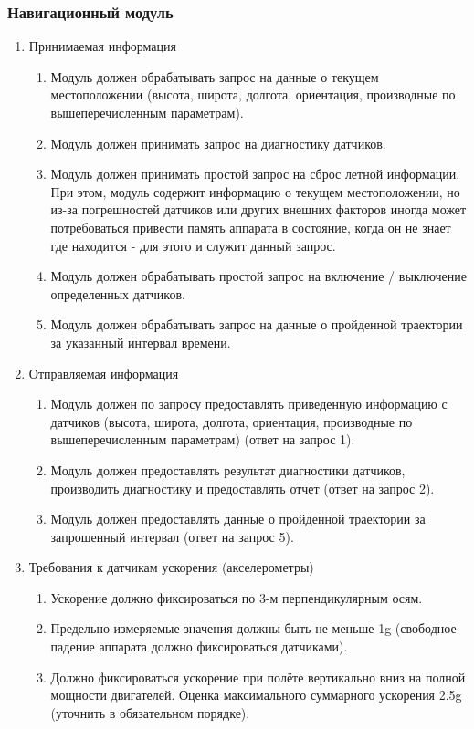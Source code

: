 \documentclass[utf8]{report}
\begin{document}
\subsubsection{Навигационный модуль}
\begin{enumerate}
  \item Принимаемая информация
  \begin{enumerate}
    \item Модуль должен обрабатывать запрос на данные о текущем местоположении (высота, широта, долгота, ориентация, производные по вышеперечисленным параметрам).
    \item Модуль должен принимать запрос на диагностику датчиков.
    \item Модуль должен принимать простой запрос на сброс летной информации. При этом, модуль содержит информацию о текущем местоположении, но из-за погрешностей датчиков или других внешних факторов иногда может потребоваться привести память аппарата в состояние, когда он не знает где находится - для этого и служит данный запрос.
    \item Модуль должен обрабатывать простой запрос на включение / выключение определенных датчиков.
    \item Модуль должен обрабатывать запрос на данные о пройденной траектории за указанный интервал времени.
  \end{enumerate}
  \item Отправляемая информация
  \begin{enumerate}
    \item Модуль должен по запросу предоставлять приведенную информацию с датчиков (высота, широта, долгота, ориентация, производные по вышеперечисленным параметрам) (ответ на запрос 1).
    \item Модуль должен предоставлять результат диагностики датчиков, производить диагностику и предоставлять отчет (ответ на запрос 2).
    \item Модуль должен предоставлять данные о пройденной траектории за запрошенный интервал (ответ на запрос 5).
  \end{enumerate}
  \item Требования к датчикам ускорения (акселерометры)
  \begin{enumerate}
    \item Ускорение должно фиксироваться по 3-м перпендикулярным осям.
    \item Предельно измеряемые значения должны быть не меньше 1g (свободное падение аппарата должно фиксироваться датчиками).
    \item Должно фиксироваться ускорение при полёте вертикально вниз на полной мощности двигателей. Оценка максимального суммарного ускорения 2.5g (уточнить в обязательном порядке).

\end{enumerate}
\end{enumerate}
\end{document}
